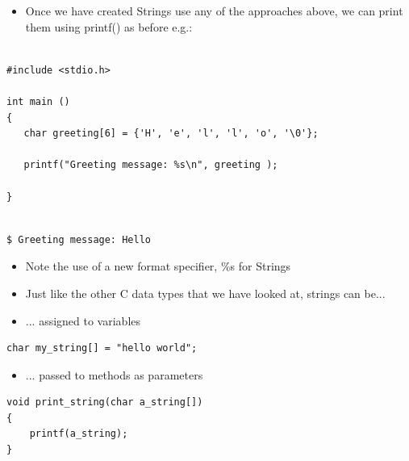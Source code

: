 \documentclass{beamer}
\begin{document}
\begin{frame}[fragile]
\begin{itemize}
\item {\color{black}
Once we have created Strings use any of the approaches above, we can print them using printf() as before e.g.:}
\end{itemize}

\begin{block}{}
\begin{lstlisting}

#include <stdio.h>

int main ()
{
   char greeting[6] = {'H', 'e', 'l', 'l', 'o', '\0'};

   printf("Greeting message: %s\n", greeting );

}

\end{lstlisting}
\end{block}

\begin{block}{}
\begin{lstlisting}

$ Greeting message: Hello

\end{lstlisting}
\end{block}

\begin{itemize}
\item {\color{black}
Note the use of a new format specifier, \%s for Strings }

\end{itemize}
\end{frame}

\begin{frame}[fragile] 
\begin{itemize}
\item Just like the other C data types that we have looked at, strings can be...
\end{itemize}

\begin{itemize}
\item ... assigned to variables
\end{itemize}
\begin{block}{}
\begin{lstlisting}
char my_string[] = "hello world";
\end{lstlisting}
\end{block} 

\begin{itemize}
\item ... passed to methods as parameters
\end{itemize}
\begin{block}{}
\begin{lstlisting}
void print_string(char a_string[])
{
    printf(a_string);   
}  
\end{lstlisting}
\end{block} 
\end{frame}
\end{document}
